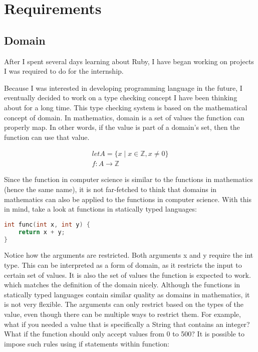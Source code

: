 \section{Requirements}

\subsection{Domain}

After I spent several days learning about Ruby, I have began working on projects I was required to do for the internship.

Because I was interested in developing programming language in the future, I eventually decided to work on a type checking concept I have been thinking about for a long time.  This type checking system is based on the mathematical concept of domain.  In mathematics, domain is a set of values the function can properly map.  In other words, if the value is part of a domain's set, then the function can use that value.

\begin{gather*}
let A = \{ x \mid x \in \mathbb{Z}, x \ne 0 \} \\
f: A \to \mathbb{Z}
\end{gather*}

Since the function in computer science is similar to the functions in mathematics (hence the same name), it is not far-fetched to think that domains in mathematics can also be applied to the functions in computer science.  With this in mind, take a look at functions in statically typed languages:

\begin{lstlisting}[language=C++, caption={Domain example}]
int func(int x, int y) {
    return x + y;
}
\end{lstlisting}

Notice how the arguments are restricted.  Both arguments x and y require the int type.  This can be interpreted as a form of domain, as it restricts the input to certain set of values.  It is also the set of values the function is expected to work. which matches the definition of the domain nicely.  Although the functions in statically typed languages contain similar quality as domains in mathematics, it is not very flexible.  The arguments can only restrict based on the types of the value, even though there can be multiple ways to restrict them.  For example, what if you needed a value that is specifically a String that contains an integer?  What if the function should only accept values from 0 to 500?  It is possible to impose such rules using if statements within function:

